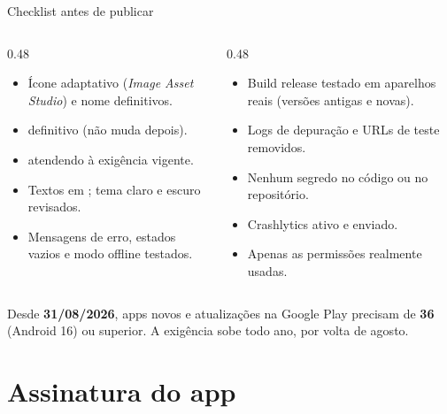 \documentclass[aspectratio=169,10pt]{beamer}
\begin{document}
\begin{frame}{Checklist antes de publicar}
  \begin{columns}[T]
    \begin{column}{0.48\textwidth}
      \begin{conceito}[Produto]
        \begin{itemize}
          \item Ícone adaptativo (\emph{Image Asset Studio}) e nome definitivos.
          \item {} definitivo (não muda depois).
          \item {} atendendo à exigência vigente.
          \item Textos em ; tema claro e escuro revisados.
          \item Mensagens de erro, estados vazios e modo offline testados.
        \end{itemize}
      \end{conceito}
    \end{column}
    \begin{column}{0.48\textwidth}
      \begin{conceito}[Técnico]
        \begin{itemize}
          \item Build release testado em aparelhos reais (versões antigas e novas).
          \item Logs de depuração e URLs de teste removidos.
          \item Nenhum segredo no código ou no repositório.
          \item Crashlytics ativo e  enviado.
          \item Apenas as permissões realmente usadas.
        \end{itemize}
      \end{conceito}
    \end{column}
  \end{columns}
  \begin{atencao}
    Desde \textbf{31/08/2026}, apps novos e atualizações na Google Play precisam de  \textbf{36} (Android 16) ou superior. A exigência sobe todo ano, por volta de agosto.
  \end{atencao}
\end{frame}

\section{Assinatura do app}
\end{document}
